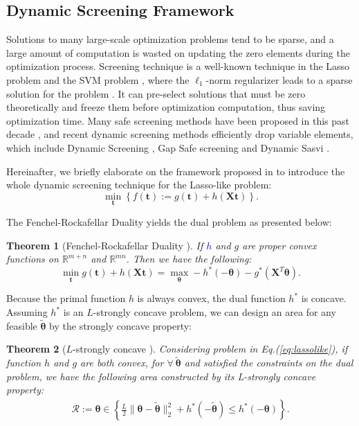 \documentclass[twoside]{article}
\theoremstyle{plain}
\newtheorem{thm}{Theorem}
\newcommand{\mat}[1]{\mathbf{#1}}
\renewcommand{\vec}[1]{\bm{#1}}
\newcommand{\changeXS}[1]{\textcolor{blue}{#1}}
\begin{document}
\subsection{Dynamic Screening Framework}
Solutions to many large-scale optimization problems tend to be sparse, and a large amount of computation is wasted on updating the zero elements during the optimization process. Screening technique is a well-known technique in the Lasso problem and the SVM problem \citep{Ogawa_ICML_2013}, where the $\ell_1$-norm regularizer leads to a sparse solution for the problem \citep{ghaoui2010safe}. It can pre-select solutions that must be zero theoretically and freeze them before optimization computation, thus saving optimization time. Many safe screening methods have been proposed in this past decade \citep{Liu_ICML_2014,Wang_JMLR_2015}, and recent dynamic screening methods efficiently drop variable elements, which include Dynamic Screening \citep{7128732}, Gap Safe screening \citep{JMLR:v18:16-577} and Dynamic Sasvi \citep{Yamada_NIPS_2021}.

Hereinafter, we briefly elaborate on the framework proposed in \citep{Yamada_NIPS_2021} to introduce the whole dynamic screening technique for the Lasso-like problem:
\begin{equation}
\label{eq:lassolike}
\min_{\vec{t}} \left\{ f(\vec{t}) := g(\vec{t}) + h(\mat{X} \vec{t}) \right\}.
\end{equation}

The Fenchel-Rockafellar Duality yields the dual problem as presented below:
\begin{thm}[Fenchel-Rockafellar Duality {\citep{Rockafellar_Springer_1998}}]
\label{Thm:FRD}
If \changeXS{$h$} and $g$ are proper convex functions on $\mathbb{R}^{m+n}$ and $\mathbb{R}^{mn}$. Then we have the following:
\begin{equation}
\label{Eq:FRD}
\min_{\vec{t}} g(\vec{t}) + h(\mat{X}\vec{t}) = \max_{\vec{\vec{\theta}}} -h^*(-\vec{\theta})-g^*(\mat{X}^T\vec{\theta}).
\end{equation}
\end{thm}

Because the primal function $h$ is always convex, the dual function $h^*$ is concave. Assuming $h^*$ is an $L$-strongly concave problem, we can design an area for any feasible $\tilde{\vec{\theta}}$ by the strongly concave property:

\begin{thm}[$L$-strongly concave {\citep[Theorem 5]{Yamada_NIPS_2021}}]
\label{Thm:circle}
Considering problem in Eq.(\ref{eq:lassolike}), if function $h$ and $g$ are both convex, for $\forall \ \tilde{\vec{\theta}}$ and satisfied the constraints on the dual problem, we have the following area constructed by its L-strongly concave property:
$$
\begin{aligned}
\mathcal{R}:=\vec{\theta} \in \left\{\frac{L}{2}\|\vec{\theta}-\tilde{\vec{\theta}}\|_2^2+h^*(-\tilde{\vec{\theta}}) \leq h^*(-\vec{\theta})\right\}.
\end{aligned}
$$
\end{thm}
\end{document}
